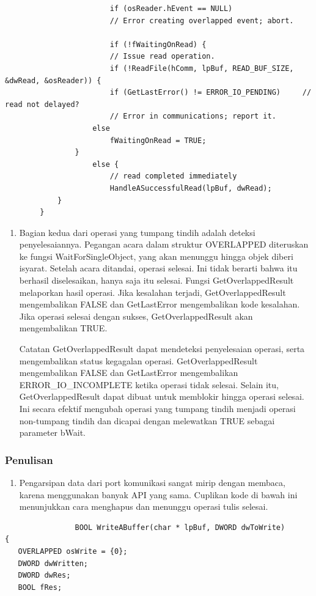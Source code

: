 \begin{enumerate}
\begin{enumerate}
\begin{verbatim}
						if (osReader.hEvent == NULL)
						// Error creating overlapped event; abort.

						if (!fWaitingOnRead) {
						// Issue read operation.
						if (!ReadFile(hComm, lpBuf, READ_BUF_SIZE, &dwRead, &osReader)) {
						if (GetLastError() != ERROR_IO_PENDING)     // read not delayed?
						// Error in communications; report it.
					else
						fWaitingOnRead = TRUE;
				}
					else {    
						// read completed immediately
						HandleASuccessfulRead(lpBuf, dwRead);
			}
		}
				\end{verbatim}

				\begin{enumerate}
						\item Bagian kedua dari operasi yang tumpang tindih adalah deteksi penyelesaiannya. Pegangan acara dalam struktur OVERLAPPED diteruskan ke fungsi WaitForSingleObject, yang akan menunggu hingga objek diberi isyarat. Setelah acara ditandai, operasi selesai. Ini tidak berarti bahwa itu berhasil diselesaikan, hanya saja itu selesai. Fungsi GetOverlappedResult melaporkan hasil operasi. Jika kesalahan terjadi, GetOverlappedResult mengembalikan FALSE dan GetLastError mengembalikan kode kesalahan. Jika operasi selesai dengan sukses, GetOverlappedResult akan mengembalikan TRUE.

						
						Catatan GetOverlappedResult dapat mendeteksi penyelesaian operasi, serta mengembalikan status kegagalan operasi. GetOverlappedResult mengembalikan FALSE dan GetLastError mengembalikan ERROR_IO_INCOMPLETE ketika operasi tidak selesai. Selain itu, GetOverlappedResult dapat dibuat untuk memblokir hingga operasi selesai. Ini secara efektif mengubah operasi yang tumpang tindih menjadi operasi non-tumpang tindih dan dicapai dengan melewatkan TRUE sebagai parameter bWait.
				\end{enumerate}


			
		\end{enumerate}
			\subsubsection{Penulisan}
				\begin{enumerate}
					\item Pengarsipan data dari port komunikasi sangat mirip dengan membaca, karena menggunakan banyak API yang sama. Cuplikan kode di bawah ini menunjukkan cara menghapus dan menunggu operasi tulis selesai.
				\end{enumerate}
				\begin{verbatim}
				BOOL WriteABuffer(char * lpBuf, DWORD dwToWrite)
{
   OVERLAPPED osWrite = {0};
   DWORD dwWritten;
   DWORD dwRes;
   BOOL fRes;


\end{verbatim}
\end{enumerate}
